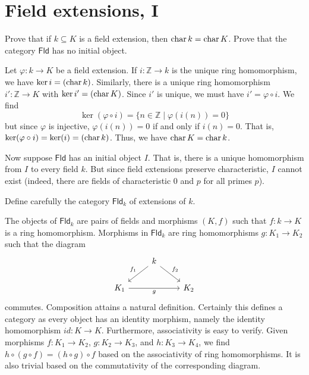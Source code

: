 \documentclass[../../master.tex]{subfiles}
\begin{document}
\section{Field extensions, I}

\begin{problem}
    Prove that if $k \subseteq K$ is a field extension, then $\operatorname{char} k = \operatorname{char} K$.
    Prove that the category $\mathsf{Fld}$ has no initial object.
\end{problem}

\begin{solution}
    Let $\varphi : k \to K$ be a field extension.
    If $i : \mathbb{Z} \to k$ is the unique ring homomorphism, we have $\ker i = (\operatorname{char} k)$.
    Similarly, there is a unique ring homomorphism $i' : \mathbb{Z} \to K$ with $\ker i' = (\operatorname{char} K)$.
    Since $i'$ is unique, we must have $i' = \varphi \circ i$.
    We find
    \[
        \ker (\varphi \circ i) = \{n \in \mathbb{Z} \mid \varphi(i(n)) = 0\}
    \]
    but since $\varphi$ is injective, $\varphi(i(n)) = 0$ if and only if $i(n) = 0$.
    That is, $\ker(\varphi \circ i) = \ker(i) = (\operatorname{char} k)$.
    Thus, we have $\operatorname{char} K = \operatorname{char} k$.

    Now suppose $\mathsf{Fld}$ has an initial object $I$.
    That is, there is a unique homomorphism from $I$ to every field $k$.
    But since field extensions preserve characteristic, $I$ cannot exist (indeed, there are fields of characteristic 0 and $p$ for all primes $p$).
\end{solution}

\begin{problem}
    Define carefully the category $\mathsf{Fld}_k$ of extensions of $k$.
\end{problem}

\begin{solution}
    The objects of $\mathsf{Fld}_k$ are pairs of fields and morphisms $(K, f)$ such that $f : k \to K$ is a ring homomorphism.
    Morphisms in $\mathsf{Fld}_k$ are ring homomorphisms $g : K_1 \to K_2$ such that the diagram
    \[
\begin{tikzcd}
	& k \\
	{K_1} && {K_2}
	\arrow["{f_1}"', from=1-2, to=2-1]
	\arrow["{f_2}", from=1-2, to=2-3]
	\arrow["g"', from=2-1, to=2-3]
\end{tikzcd}
    \]
    commutes.
    Composition attains a natural definition.
    Certainly this defines a category as every object has an identity morphism, namely the identity homomorphism $id : K \to K$.
    Furthermore, associativity is easy to verify.
    Given morphisms $f : K_1 \to K_2$, $g : K_2 \to K_3$, and $h : K_3 \to K_4$, we find $h \circ (g \circ f) = (h \circ g) \circ f$ based on the associativity of ring homomorphisms.
    It is also trivial based on the commutativity of the corresponding diagram.
\end{solution}
\end{document}

